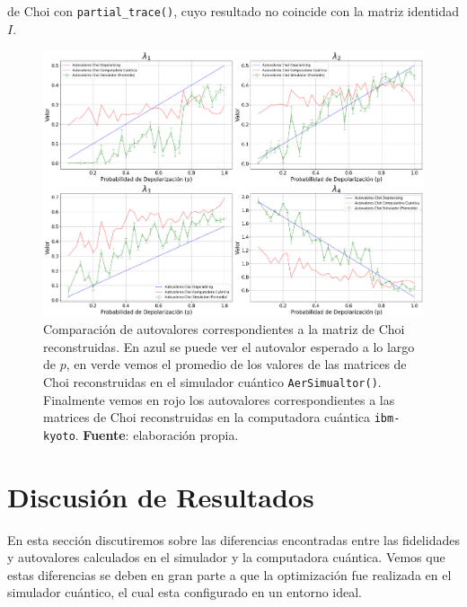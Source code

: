 \documentclass[letterpaper,12pt]{thesisECFM}
\theoremstyle{plain}
\theoremstyle{definition}
\theoremstyle{remark}
\newcommand{\1}{\mathbb{1}}
\begin{document}
de Choi con \texttt{partial\_trace()}, cuyo resultado no coincide con la matriz
identidad $I$.  
\begin{figure}[h!] 
    \centering 
    \includegraphics[width=0.90 \linewidth]{imagenes/eigenvalores_comparacion.png}
    \caption{Comparación de autovalores correspondientes a la matriz de Choi reconstruidas. En azul se puede ver el autovalor esperado a lo largo de $p$, en verde vemos el promedio de los valores de las matrices de Choi reconstruidas  en el simulador cuántico \texttt{AerSimualtor()}. Finalmente vemos en rojo los autovalores correspondientes a las matrices de Choi reconstruidas en la computadora cuántica \texttt{ibm-kyoto}. \textbf{Fuente}: elaboración propia. }
    \label{fig:comparacion_autovalores}
\end{figure}
\section{Discusión de Resultados} %
En esta sección discutiremos sobre las diferencias encontradas entre las
fidelidades y autovalores calculados en el simulador y la computadora cuántica.
Vemos que estas diferencias se deben en gran parte a que la optimización fue realizada en el simulador cuántico, el cual esta configurado en un entorno ideal.  
\end{document}
